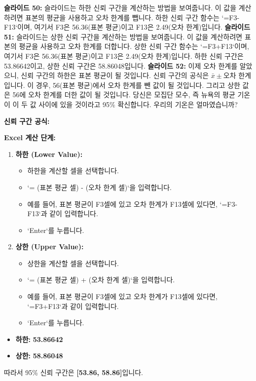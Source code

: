 \documentclass[11pt,a4paper]{article}
\begin{document}
\begin{tcolorbox}[title=슬라이드 50-52: 뉴욕 일일 기온 샘플 Excel 시트 (19/22 - 21/22)]
\textbf{슬라이드 50:} 슬라이드는 하한 신뢰 구간을 계산하는 방법을 보여줍니다. 이 값을 계산하려면 표본의 평균을 사용하고 오차 한계를 뺍니다. 하한 신뢰 구간 함수는 `=F3-F13`이며, 여기서 F3은 56.36(표본 평균)이고 F13은 2.49(오차 한계)입니다.
\textbf{슬라이드 51:} 슬라이드는 상한 신뢰 구간을 계산하는 방법을 보여줍니다. 이 값을 계산하려면 표본의 평균을 사용하고 오차 한계를 더합니다. 상한 신뢰 구간 함수는 `=F3+F13`이며, 여기서 F3은 56.36(표본 평균)이고 F13은 2.49(오차 한계)입니다. 하한 신뢰 구간은 53.86642이고, 상한 신뢰 구간은 58.86048입니다.
\textbf{슬라이드 52:} 이제 오차 한계를 알았으니, 신뢰 구간의 하한은 표본 평균이 될 것입니다. 신뢰 구간의 공식은 $\bar{x} \pm \text{오차 한계}$입니다. 이 경우, 56(표본 평균)에서 오차 한계를 뺀 값이 될 것입니다. 그리고 상한 값은 56에 오차 한계를 더한 값이 될 것입니다. 당신은 모집단 모수, 즉 뉴욕의 평균 기온이 이 두 값 사이에 있을 것이라고 95\% 확신합니다. 우리의 기온은 얼마였습니까?
\end{tcolorbox}

\textbf{신뢰 구간 공식:}

\textbf{Excel 계산 단계:}
\begin{enumerate}
    \item \textbf{하한 (Lower Value):}
        \begin{itemize}
            \item 하한을 계산할 셀을 선택합니다.
            \item `= (표본 평균 셀) - (오차 한계 셀)`을 입력합니다.
            \item 예를 들어, 표본 평균이 F3셀에 있고 오차 한계가 F13셀에 있다면, `=F3-F13`과 같이 입력합니다.
            \item `Enter`를 누릅니다.
        \end{itemize}
    \item \textbf{상한 (Upper Value):}
        \begin{itemize}
            \item 상한을 계산할 셀을 선택합니다.
            \item `= (표본 평균 셀) + (오차 한계 셀)`을 입력합니다.
            \item 예를 들어, 표본 평균이 F3셀에 있고 오차 한계가 F13셀에 있다면, `=F3+F13`과 같이 입력합니다.
            \item `Enter`를 누릅니다.
        \end{itemize}
\end{enumerate}
\begin{tcolorbox}[colback=mygreen!10!white, colframe=mygreen!75!black, title=계산 결과: 95\% 신뢰 구간]
\begin{itemize}
    \item \textbf{하한:} \textbf{53.86642}
    \item \textbf{상한:} \textbf{58.86048}
\end{itemize}
따라서 95\% 신뢰 구간은 \textbf{[53.86, 58.86]}입니다.
\end{tcolorbox}
\end{document}
